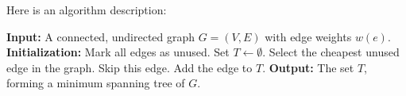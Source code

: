 Here is an algorithm description:
\begin{algorithm}[H]
\caption{Kruskal's Algorithm (Descriptive Version)}
\begin{algorithmic}[1]
\State \textbf{Input:} A connected, undirected graph \( G = (V, E) \) with edge weights \( w(e) \).
\State \textbf{Initialization:} Mark all edges as unused. Set \( T \gets \emptyset \).
\Repeat
  \State Select the cheapest unused edge in the graph.
    \State Skip this edge.
  \Else
    \State Add the edge to \( T \).
  \EndIf
{}
\State \textbf{Output:} The set \( T \), forming a minimum spanning tree of \( G \).
\end{algorithmic}
\end{algorithm}

